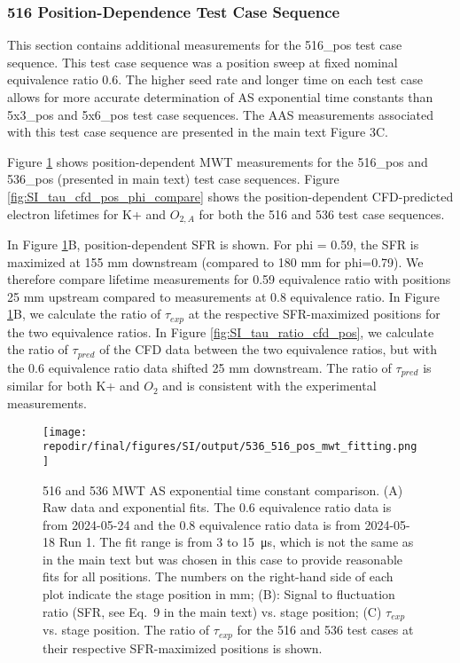 \clearpage
\subsubsection{516 Position-Dependence Test Case Sequence}

This section contains additional measurements for the 516\_pos test case sequence. This test case sequence was a position sweep at fixed nominal equivalence ratio 0.6. The higher seed rate and longer time on each test case allows for more accurate determination of AS exponential time constants than 5x3\_pos and 5x6\_pos test case sequences. The AAS measurements associated with this test case sequence are presented in the main text Figure 3C. 

Figure \ref{fig:SI_536_516_pos_mwt_fitting} shows position-dependent MWT measurements for the 516\_pos and 536\_pos (presented in main text) test case sequences. Figure \ref{fig:SI_tau_cfd_pos_phi_compare} shows the position-dependent CFD-predicted electron lifetimes for K+ and $O_{2,A}$ for both the 516 and 536 test case sequences. 

In Figure \ref{fig:SI_536_516_pos_mwt_fitting}B, position-dependent SFR is shown. For phi = 0.59, the SFR is maximized at 155 mm downstream (compared to 180 mm for phi=0.79). We therefore compare lifetime measurements for 0.59 equivalence ratio with positions 25 mm upstream compared to measurements at 0.8 equivalence ratio. In Figure \ref{fig:SI_536_516_pos_mwt_fitting}B, we calculate the ratio of $\tau_{exp}$ at the respective SFR-maximized positions for the two equivalence ratios. In Figure \ref{fig:SI_tau_ratio_cfd_pos}, we calculate the ratio of $\tau_{pred}$ of the CFD data between the two equivalence ratios, but with the 0.6 equivalence ratio data shifted 25 mm downstream. The ratio of $\tau_{pred}$ is similar for both K+ and $O_2$ and is consistent with the experimental measurements.

\begin{figure}[]
\centering
\texttt{[image: \\repodir/final/figures/SI/output/536\_516\_pos\_mwt\_fitting.png]}
\caption{516 and 536 MWT AS exponential time constant comparison. (A) Raw data and exponential fits. The 0.6 equivalence ratio data is from 2024-05-24 and the 0.8 equivalence ratio data is from 2024-05-18 Run 1. The fit range is from 3 to \SI{15} {\micro \second}, which is not the same as in the main text but was chosen in this case to provide reasonable fits for all positions. The numbers on the right-hand side of each plot indicate the stage position in mm; (B): Signal to fluctuation ratio (SFR, see Eq.\ 9 in the main text) vs. stage position; (C) $\tau_{exp}$ vs. stage position. The ratio of $\tau_{exp}$ for the 516 and 536 test cases at their respective SFR-maximized positions is shown.} 
\label{fig:SI_536_516_pos_mwt_fitting}
\end{figure}

